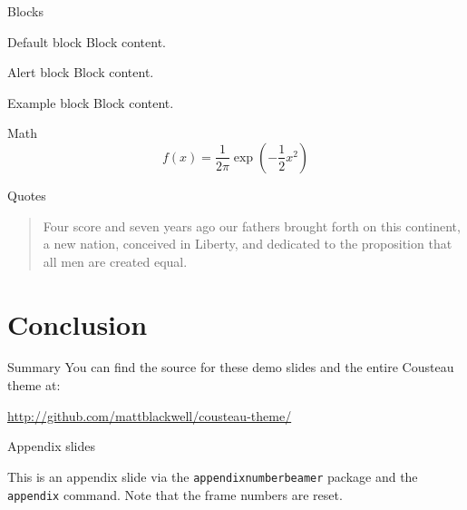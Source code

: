 \documentclass{beamer}
\begin{document}
\begin{frame}{Blocks}

  \begin{block}{Default block}
    Block content.
  \end{block}

  \begin{alertblock}{Alert block}
    Block content.
  \end{alertblock}

  \begin{exampleblock}{Example block}  
    Block content.
  \end{exampleblock}

\end{frame}

\begin{frame}{Math}
  \[f(x) = \frac{1}{2\pi}\exp\left( -\frac{1}{2}x^2 \right)\]
\end{frame}

\begin{frame}{Quotes}
  \begin{quote}
    Four score and seven years ago our fathers brought forth on this continent, a new nation, conceived in Liberty, and dedicated to the proposition that all men are created equal.
  \end{quote}
\end{frame}

\section{Conclusion}

\begin{frame}{Summary}
  You can find the source for these demo slides and the entire Cousteau theme at:
  \begin{center}
    \url{http://github.com/mattblackwell/cousteau-theme/}
  \end{center}
  
\end{frame}

\appendix

\begin{frame}{Appendix slides}

  This is an appendix slide via the \texttt{appendixnumberbeamer} package and the \texttt{\\appendix} command. Note that the frame numbers are reset. 
  
\end{frame}
\end{document}
